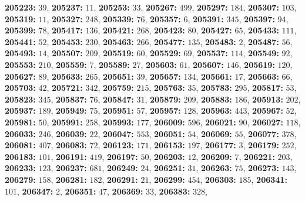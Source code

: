 \textsf{\bfseries 205223:} $39$, \textsf{\bfseries 205237:} $11$, \textsf{\bfseries 205253:} $33$, \textsf{\bfseries 205267:} $499$, \textsf{\bfseries 205297:} $184$, \textsf{\bfseries 205307:} $103$, \textsf{\bfseries 205319:} $11$, \textsf{\bfseries 205327:} $248$, \textsf{\bfseries 205339:} $76$, \textsf{\bfseries 205357:} $6$, \textsf{\bfseries 205391:} $345$, \textsf{\bfseries 205397:} $94$, \textsf{\bfseries 205399:} $78$, \textsf{\bfseries 205417:} $136$, \textsf{\bfseries 205421:} $268$, \textsf{\bfseries 205423:} $80$, \textsf{\bfseries 205427:} $65$, \textsf{\bfseries 205433:} $111$, \textsf{\bfseries 205441:} $52$, \textsf{\bfseries 205453:} $230$, \textsf{\bfseries 205463:} $266$, \textsf{\bfseries 205477:} $135$, \textsf{\bfseries 205483:} $2$, \textsf{\bfseries 205487:} $56$, \textsf{\bfseries 205493:} $14$, \textsf{\bfseries 205507:} $209$, \textsf{\bfseries 205519:} $60$, \textsf{\bfseries 205529:} $69$, \textsf{\bfseries 205537:} $114$, \textsf{\bfseries 205549:} $92$, \textsf{\bfseries 205553:} $210$, \textsf{\bfseries 205559:} $7$, \textsf{\bfseries 205589:} $27$, \textsf{\bfseries 205603:} $61$, \textsf{\bfseries 205607:} $146$, \textsf{\bfseries 205619:} $120$, \textsf{\bfseries 205627:} $89$, \textsf{\bfseries 205633:} $265$, \textsf{\bfseries 205651:} $39$, \textsf{\bfseries 205657:} $134$, \textsf{\bfseries 205661:} $17$, \textsf{\bfseries 205663:} $66$, \textsf{\bfseries 205703:} $42$, \textsf{\bfseries 205721:} $342$, \textsf{\bfseries 205759:} $215$, \textsf{\bfseries 205763:} $35$, \textsf{\bfseries 205783:} $295$, \textsf{\bfseries 205817:} $53$, \textsf{\bfseries 205823:} $345$, \textsf{\bfseries 205837:} $76$, \textsf{\bfseries 205847:} $31$, \textsf{\bfseries 205879:} $209$, \textsf{\bfseries 205883:} $186$, \textsf{\bfseries 205913:} $202$, \textsf{\bfseries 205937:} $189$, \textsf{\bfseries 205949:} $75$, \textsf{\bfseries 205951:} $57$, \textsf{\bfseries 205957:} $128$, \textsf{\bfseries 205963:} $443$, \textsf{\bfseries 205967:} $52$, \textsf{\bfseries 205981:} $50$, \textsf{\bfseries 205991:} $258$, \textsf{\bfseries 205993:} $177$, \textsf{\bfseries 206009:} $596$, \textsf{\bfseries 206021:} $90$, \textsf{\bfseries 206027:} $118$, \textsf{\bfseries 206033:} $246$, \textsf{\bfseries 206039:} $22$, \textsf{\bfseries 206047:} $553$, \textsf{\bfseries 206051:} $54$, \textsf{\bfseries 206069:} $55$, \textsf{\bfseries 206077:} $378$, \textsf{\bfseries 206081:} $407$, \textsf{\bfseries 206083:} $72$, \textsf{\bfseries 206123:} $171$, \textsf{\bfseries 206153:} $197$, \textsf{\bfseries 206177:} $3$, \textsf{\bfseries 206179:} $252$, \textsf{\bfseries 206183:} $101$, \textsf{\bfseries 206191:} $419$, \textsf{\bfseries 206197:} $50$, \textsf{\bfseries 206203:} $12$, \textsf{\bfseries 206209:} $7$, \textsf{\bfseries 206221:} $203$, \textsf{\bfseries 206233:} $123$, \textsf{\bfseries 206237:} $681$, \textsf{\bfseries 206249:} $24$, \textsf{\bfseries 206251:} $31$, \textsf{\bfseries 206263:} $75$, \textsf{\bfseries 206273:} $143$, \textsf{\bfseries 206279:} $158$, \textsf{\bfseries 206281:} $182$, \textsf{\bfseries 206291:} $21$, \textsf{\bfseries 206299:} $454$, \textsf{\bfseries 206303:} $185$, \textsf{\bfseries 206341:} $101$, \textsf{\bfseries 206347:} $2$, \textsf{\bfseries 206351:} $47$, \textsf{\bfseries 206369:} $33$, \textsf{\bfseries 206383:} $328$, 
